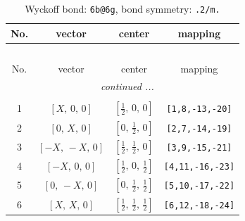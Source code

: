 \documentclass[fleqn,8pt]{jsarticle}
\begin{document}
\renewcommand{\arraystretch}{1.2}
\begin{longtable}{cccc}
\caption{Wyckoff bond: {\tt 6b@6g}, bond symmetry: {\tt .2/m.}}
 \\
 \hline \hline
No. & vector & center & mapping \\ \hline \endfirsthead

\multicolumn{3}{l}{\tablename\ \thetable{}} \\
 \hline \hline
No. & vector & center & mapping \\ \hline \endhead

 \hline \hline
\multicolumn{3}{r}{\footnotesize\it continued ...} \\ \endfoot

 \hline \hline
\multicolumn{3}{r}{} \\ \endlastfoot

1 & $\left[ X,\, 0,\, 0 \right]$ & $\left[ \frac{1}{2},\, 0,\, 0 \right]$ & {\tt [1,8,-13,-20]} \\ \hline
2 & $\left[ 0,\, X,\, 0 \right]$ & $\left[ 0,\, \frac{1}{2},\, 0 \right]$ & {\tt [2,7,-14,-19]} \\ \hline
3 & $\left[ - X,\, - X,\, 0 \right]$ & $\left[ \frac{1}{2},\, \frac{1}{2},\, 0 \right]$ & {\tt [3,9,-15,-21]} \\ \hline
4 & $\left[ - X,\, 0,\, 0 \right]$ & $\left[ \frac{1}{2},\, 0,\, \frac{1}{2} \right]$ & {\tt [4,11,-16,-23]} \\ \hline
5 & $\left[ 0,\, - X,\, 0 \right]$ & $\left[ 0,\, \frac{1}{2},\, \frac{1}{2} \right]$ & {\tt [5,10,-17,-22]} \\ \hline
6 & $\left[ X,\, X,\, 0 \right]$ & $\left[ \frac{1}{2},\, \frac{1}{2},\, \frac{1}{2} \right]$ & {\tt [6,12,-18,-24]} \\
\end{longtable}
\renewcommand{\arraystretch}{1.2}
\end{document}

